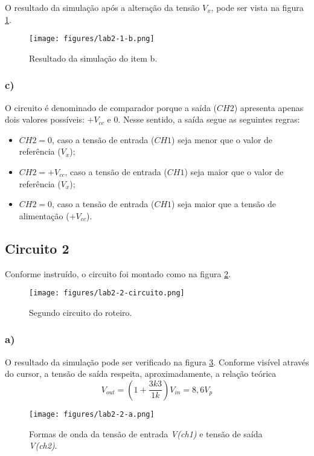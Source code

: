 \documentclass[a4paper]{report}
\begin{document}
O resultado da simulação após a alteração da tensão $V_x$, pode ser vista na figura \ref{fig:figures-lab2-1-b-png}.

\begin{figure}[H]
    \centering
    \texttt{[image: figures/lab2-1-b.png]}
    \caption{Resultado da simulação do item b.}
    \label{fig:figures-lab2-1-b-png}
\end{figure}

\subsubsection*{c)}

O circuito é denominado de comparador porque a saída ($CH2$) apresenta apenas dois valores possíveis: $+V_{cc}$ e 0. Nesse sentido, a saída segue as seguintes regras:
\begin{itemize}
    \item $CH2=0$, caso a tensão de entrada ($CH1$) seja menor que o valor de referência ($V_x$);
    \item $CH2=+V_{cc}$, caso a tensão de entrada ($CH1$) seja maior que o valor de referência ($V_x$);
    \item $CH2=0$, caso a tensão de entrada ($CH1$) seja maior que a tensão de alimentação ($+V_{cc}$).
\end{itemize}
\subsection*{Circuito 2}

Conforme instruído, o circuito foi montado como na figura \ref{fig:figures-lab2-2-circuito-png}.

\begin{figure}[H]
    \centering
    \texttt{[image: figures/lab2-2-circuito.png]}
    \caption{Segundo circuito do roteiro.}
    \label{fig:figures-lab2-2-circuito-png}
\end{figure}

\subsubsection*{a)}

O resultado da simulação pode ser verificado na figura \ref{fig:figures-lab2-2-a-png}. Conforme visível através do cursor, a tensão de saída respeita, aproximadamente, a relação teórica \[
V_{out}= \left( 1+\frac{3k3}{1k} \right)V_{in} = 8,6 V_p
\] 

\begin{figure}[H]
    \centering
    \texttt{[image: figures/lab2-2-a.png]}
    \caption{Formas de onda da tensão de entrada \emph{V(ch1)} e tensão de saída \emph{V(ch2)}.}
    \label{fig:figures-lab2-2-a-png}
\end{figure}
\end{document}
